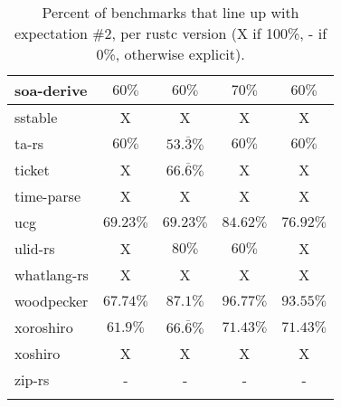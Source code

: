 \documentclass{article}
\begin{document}
\begin{longtable}[h!]{|l|c|c|c|c|}
     \hline
    soa-derive & $60\%$ & $60\%$ & $70\%$ & $60\%$ \\ %
    \hline
    sstable & X & X & X & X \\ %
     \hline
    ta-rs & $60\%$ & $53.\overline{3}\%$ & $60\%$ & $60\%$ \\ %
    \hline
    ticket & X & $66.\overline{6}\%$ & X & X \\ %
    \hline
    time-parse & X & X & X & X \\ %
    \hline
    ucg & $69.23\%$ & $69.23\%$ & $84.62\%$ & $76.92\%$ \\ %
    \hline
    ulid-rs & X & $80\%$ & $60\%$ & X \\ %
    \hline
    whatlang-rs & X & X & X & X \\ %
     \hline
    woodpecker & $67.74\%$ & $87.1\%$ & $96.77\%$ & $93.55\%$ \\ %
    \hline
    xoroshiro & $61.9\%$ & $66.\overline{6}\%$ & $71.43\%$ & $71.43\%$ \\ %
    \hline
    xoshiro & X & X & X & X \\ %
    \hline
    zip-rs & - & - & - & - \\ %
    \hline
  \caption{Percent of benchmarks that line up with expectation \#2, per rustc version (X if 100\%, - if 0\%, otherwise explicit).}
  \label{table:qual2}
\end{longtable}
\end{document}
